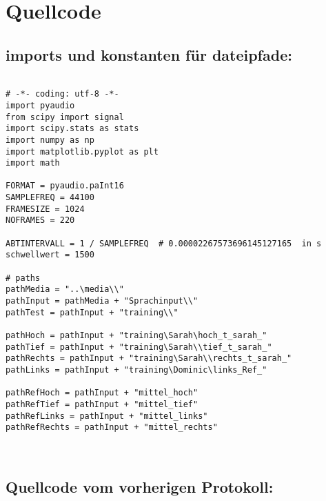 \documentclass[12pt, oneside, a4paper, \docLanguage]{report}
\begin{document}
\section{Quellcode}
\label{chap:APPENDIX_SOURCECODE}


\subsection{imports und konstanten für dateipfade: }


\begin{verbatim}

# -*- coding: utf-8 -*-
import pyaudio
from scipy import signal
import scipy.stats as stats
import numpy as np
import matplotlib.pyplot as plt
import math

FORMAT = pyaudio.paInt16
SAMPLEFREQ = 44100
FRAMESIZE = 1024
NOFRAMES = 220

ABTINTERVALL = 1 / SAMPLEFREQ  # 0.00002267573696145127165  in s
schwellwert = 1500

# paths
pathMedia = "..\media\\"
pathInput = pathMedia + "Sprachinput\\"
pathTest = pathInput + "training\\"

pathHoch = pathInput + "training\Sarah\hoch_t_sarah_"
pathTief = pathInput + "training\Sarah\\tief_t_sarah_"
pathRechts = pathInput + "training\Sarah\\rechts_t_sarah_"
pathLinks = pathInput + "training\Dominic\links_Ref_"

pathRefHoch = pathInput + "mittel_hoch"
pathRefTief = pathInput + "mittel_tief"
pathRefLinks = pathInput + "mittel_links"
pathRefRechts = pathInput + "mittel_rechts"



\end{verbatim}

\subsection{Quellcode vom vorherigen Protokoll:}
\end{document}
